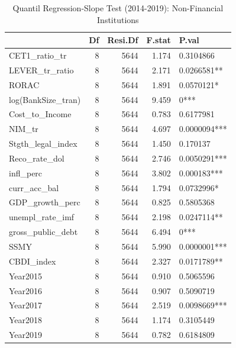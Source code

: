 \begin{table}[ht]
\centering
\caption{Quantil Regression-Slope Test (2014-2019): Non-Financial Institutions} 
\begingroup\small
\begin{tabular}{lrrrl}
  \toprule
 & Df & Resi.Df & F.stat & P.val \\ 
  \midrule
CET1\_ratio\_tr & 8 & 5644 & 1.174 & 0.3104866 \\ 
  LEVER\_tr\_ratio & 8 & 5644 & 2.171 & 0.0266581** \\ 
  RORAC & 8 & 5644 & 1.891 & 0.0570121* \\ 
  log(BankSize\_tran) & 8 & 5644 & 9.459 & 0*** \\ 
  Cost\_to\_Income & 8 & 5644 & 0.783 & 0.6177981 \\ 
  NIM\_tr & 8 & 5644 & 4.697 & 0.0000094*** \\ 
  Stgth\_legal\_index & 8 & 5644 & 1.450 & 0.170137 \\ 
  Reco\_rate\_dol & 8 & 5644 & 2.746 & 0.0050291*** \\ 
  infl\_perc & 8 & 5644 & 3.802 & 0.000183*** \\ 
  curr\_acc\_bal & 8 & 5644 & 1.794 & 0.0732996* \\ 
  GDP\_growth\_perc & 8 & 5644 & 0.825 & 0.5805368 \\ 
  unempl\_rate\_imf & 8 & 5644 & 2.198 & 0.0247114** \\ 
  gross\_public\_debt & 8 & 5644 & 6.494 & 0*** \\ 
  SSMY & 8 & 5644 & 5.990 & 0.0000001*** \\ 
  CBDI\_index & 8 & 5644 & 2.327 & 0.0171789** \\ 
  Year2015 & 8 & 5644 & 0.910 & 0.5065596 \\ 
  Year2016 & 8 & 5644 & 0.907 & 0.5090719 \\ 
  Year2017 & 8 & 5644 & 2.519 & 0.0098669*** \\ 
  Year2018 & 8 & 5644 & 1.174 & 0.3105449 \\ 
  Year2019 & 8 & 5644 & 0.782 & 0.6184809 \\ 
   \bottomrule
\end{tabular}
\endgroup
\end{table}
